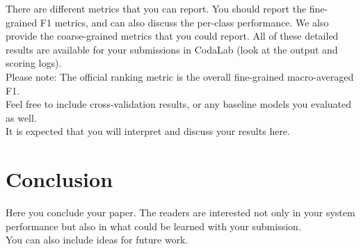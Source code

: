 \documentclass[11pt]{article}
\begin{document}
There are different metrics that you can report. You should report the fine-grained F1 metrics, and can also discuss the per-class performance. We also provide the coarse-grained metrics that you could report. All of these detailed results are available for your submissions in CodaLab (look at the output and scoring logs). \\

Please note: The official ranking metric is the overall fine-grained macro-averaged F1.\\


Feel free to include cross-validation results, or any baseline models you evaluated as well.\\

It is expected that you will interpret and discuss your results here.

\section{Conclusion}

Here you conclude your paper. The readers are interested not only in your system performance but also in what could be learned with your submission.\\

You can also include ideas for future work.









\end{document}
